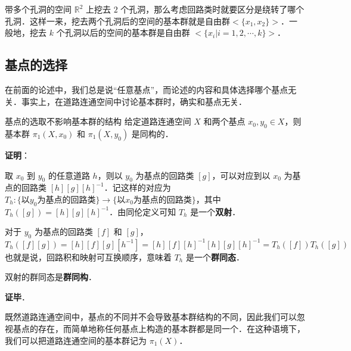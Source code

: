 \begin{example}{带多个孔洞的空间}
$\mathbb{R}^2$ 上挖去 $2$ 个孔洞，那么考虑回路类时就要区分是绕转了哪个孔洞．这样一来，挖去两个孔洞后的空间的基本群就是自由群$<\{x_1, x_2\}>$．一般地，挖去 $k$ 个孔洞以后的空间的基本群是自由群 $<\{x_i|i=1, 2, \cdots, k\}>$．
\end{example}

\subsection{基点的选择}

在前面的论述中，我们总是说“任意基点”，而论述的内容和具体选择哪个基点无关．事实上，在道路连通空间中讨论基本群时，确实和基点无关．

\begin{theorem}{基点的选取不影响基本群的结构}
给定道路连通空间 $X$ 和两个基点 $x_0, y_0\in X$，则基本群 $\pi_1(X, x_0)$ 和 $\pi_1(X, y_0)$ 是同构的．
\end{theorem}

\textbf{证明}：

取 $x_0$ 到 $y_0$ 的任意道路 $h$，则以 $y_0$ 为基点的回路类 $[g]$，可以对应到以 $x_0$ 为基点的回路类 $[h][g][h]^{-1}$．记这样的对应为 $T_h: \{\text{以} y_0 \text{为基点的回路类}\}\rightarrow\{\text{以} x_0 \text{为基点的回路类}\}$，其中 $T_h([g])=[h][g][h]^{-1}$．由同伦定义可知 $T_h$ 是一个\textbf{双射}．

对于 $y_0$ 为基点的回路类 $[f]$ 和 $[g]$，$$T_h([f][g])=[h][f][g][h^{-1}]=[h][f][h]^{-1}[h][g][h]^{-1}=T_h([f])T_h([g])$$
也就是说，回路积和映射可互换顺序，意味着 $T_h$ 是一个\textbf{群同态}．

双射的群同态是\textbf{群同构}．

\textbf{证毕}．

既然道路连通空间中，基点的不同并不会导致基本群结构的不同，因此我们可以忽视基点的存在，而简单地称任何基点上构造的基本群都是同一个．在这种语境下，我们可以把道路连通空间的基本群记为 $\pi_1(X)$．


